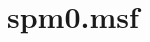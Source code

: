\documentclass[justified]{tufte-book} %
\begin{document}
\section{spm0.msf}


\backmatter




\printindex %
\end{document}
